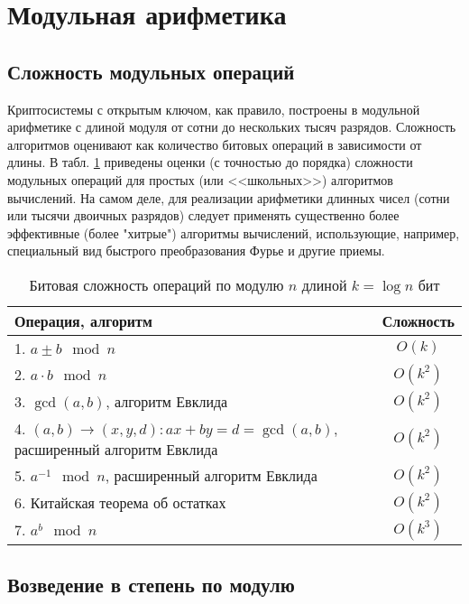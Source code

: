 \section{Модульная арифметика}

\subsection{Сложность модульных операций}

Криптосистемы с открытым ключом, как правило, построены в модульной арифметике с длиной модуля от сотни до нескольких тысяч разрядов. Сложность алгоритмов оценивают как количество битовых операций в зависимости от длины. В табл. \ref{tab:mod-binary-complexity} приведены оценки (с точностью до порядка) сложности модульных операций для простых (или <<школьных>>) алгоритмов вычислений. На самом деле, для реализации арифметики длинных чисел (сотни или тысячи двоичных разрядов) следует применять существенно более эффективные (более "хитрые") алгоритмы вычислений, использующие, например, специальный вид быстрого преобразования Фурье и другие приемы.

\begin{table}[!ht]
    \centering
    \caption{Битовая сложность операций по модулю $n$ длиной $k= \log n$ бит\label{tab:mod-binary-complexity}}
    \begin{tabular}{| p{} | c |}
        \hline
        Операция, алгоритм & Сложность \\
        \hline
        1. $a \pm b \mod n$ & $O(k)$ \\
        2. $a \cdot b \mod n$ & $O(k^2)$ \\
        3. $\gcd(a, b)$, алгоритм Евклида & $O(k^2)$ \\
        4. $(a,b) \rightarrow (x,y,d) : ax + by = d = \gcd(a,b)$, расширенный алгоритм Евклида & $O(k^2)$ \\
        5. $a^{-1} \mod n$, расширенный алгоритм Евклида & $O(k^2)$ \\
        6. Китайская теорема об остатках & $O(k^2)$ \\
        7. $a^b \mod n$ & $O(k^3)$ \\
        \hline
    \end{tabular}

\end{table}


\subsection{Возведение в степень по модулю}

